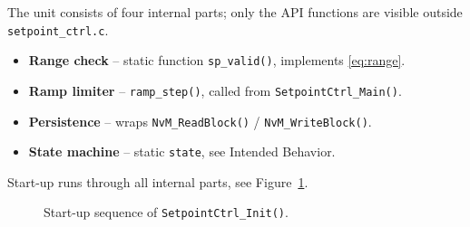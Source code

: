 \begin{InternalArchitecture}
The unit consists of four internal parts; only the API functions are visible
outside \texttt{setpoint\_ctrl.c}.

\begin{center}
\end{center}

\begin{itemize}
  \item \textbf{Range check} -- static function \texttt{sp\_valid()}, implements \eqref{eq:range}.
  \item \textbf{Ramp limiter} -- \texttt{ramp\_step()}, called from \texttt{SetpointCtrl\_Main()}.
  \item \textbf{Persistence} -- wraps \texttt{NvM\_ReadBlock()} / \texttt{NvM\_WriteBlock()}.
  \item \textbf{State machine} -- static \texttt{state}, see Intended Behavior.
\end{itemize}

Start-up runs through all internal parts, see Figure~\ref{fig:init-seq}.

\begin{figure}[htbp]
  \centering
  \caption{Start-up sequence of \texttt{SetpointCtrl\_Init()}.}
  \label{fig:init-seq}
\end{figure}
\end{InternalArchitecture}

